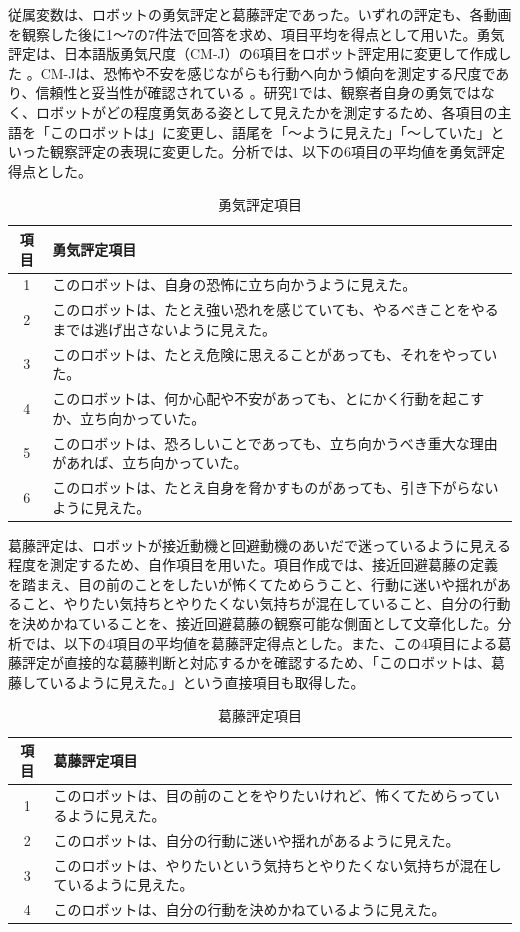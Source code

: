 \documentclass[utf8]{FrontiersinHarvard}
\begin{document}
従属変数は、ロボットの勇気評定と葛藤評定であった。いずれの評定も、各動画を観察した後に1〜7の7件法で回答を求め、項目平均を得点として用いた。勇気評定は、日本語版勇気尺度（CM-J）の6項目をロボット評定用に変更して作成した \citep{shimotsukasa2023}。CM-Jは、恐怖や不安を感じながらも行動へ向かう傾向を測定する尺度であり、信頼性と妥当性が確認されている \citep{shimotsukasa2023}。研究1では、観察者自身の勇気ではなく、ロボットがどの程度勇気ある姿として見えたかを測定するため、各項目の主語を「このロボットは」に変更し、語尾を「〜ように見えた」「〜していた」といった観察評定の表現に変更した。分析では、以下の6項目の平均値を勇気評定得点とした。

\begin{table}[htbp]
\centering
\small
\caption{勇気評定項目}
\begin{tabularx}{\linewidth}{cX}
\toprule
項目 & 勇気評定項目 \\
\midrule
1 & このロボットは、自身の恐怖に立ち向かうように見えた。 \\
2 & このロボットは、たとえ強い恐れを感じていても、やるべきことをやるまでは逃げ出さないように見えた。 \\
3 & このロボットは、たとえ危険に思えることがあっても、それをやっていた。 \\
4 & このロボットは、何か心配や不安があっても、とにかく行動を起こすか、立ち向かっていた。 \\
5 & このロボットは、恐ろしいことであっても、立ち向かうべき重大な理由があれば、立ち向かっていた。 \\
6 & このロボットは、たとえ自身を脅かすものがあっても、引き下がらないように見えた。 \\
\bottomrule
\end{tabularx}
\end{table}


葛藤評定は、ロボットが接近動機と回避動機のあいだで迷っているように見える程度を測定するため、自作項目を用いた。項目作成では、接近回避葛藤の定義 \citep{lewin1931,miller1944} を踏まえ、目の前のことをしたいが怖くてためらうこと、行動に迷いや揺れがあること、やりたい気持ちとやりたくない気持ちが混在していること、自分の行動を決めかねていることを、接近回避葛藤の観察可能な側面として文章化した。分析では、以下の4項目の平均値を葛藤評定得点とした。また、この4項目による葛藤評定が直接的な葛藤判断と対応するかを確認するため、「このロボットは、葛藤しているように見えた。」という直接項目も取得した。

\begin{table}[htbp]
\centering
\small
\caption{葛藤評定項目}
\begin{tabularx}{\linewidth}{cX}
\toprule
項目 & 葛藤評定項目 \\
\midrule
1 & このロボットは、目の前のことをやりたいけれど、怖くてためらっているように見えた。 \\
2 & このロボットは、自分の行動に迷いや揺れがあるように見えた。 \\
3 & このロボットは、やりたいという気持ちとやりたくない気持ちが混在しているように見えた。 \\
4 & このロボットは、自分の行動を決めかねているように見えた。 \\
\bottomrule
\end{tabularx}
\end{table}
\end{document}

